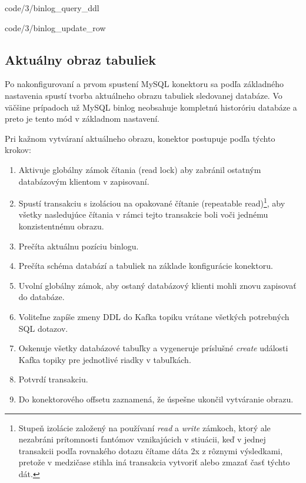 
            {code/3/binlog_query_ddl}


            {code/3/binlog_update_row}
            
\subsection{Aktuálny obraz tabuliek} \label{debezium:conistent_snapshot}
Po nakonfigurovaní a prvom spustení MySQL konektoru sa podľa základného nastavenia spustí tvorba aktuálneho obrazu tabuliek sledovanej databáze. Vo väčšine prípadoch už MySQL binlog neobsahuje kompletnú historóriu databáze a preto je tento mód v základnom nastavení. 

Pri kažnom vytváraní aktuálneho obrazu, konektor postupuje podľa týchto krokov\cite{debezium:consistent_snapshot}:
\begin{enumerate}
\item Aktivuje globálny zámok čítania (read lock) aby zabránil ostatným databázovým klientom v zapisovaní.
\item Spustí transakciu s izoláciou na opakované čítanie (repeatable read)\footnote{Stupeň izolácie založený na používaní \textit{read} a \textit{write} zámkoch, ktorý ale nezabráni prítomnosti fantómov vznikajúcich v stiuácii, keď v jednej transakcii podľa rovnakého dotazu čítame dáta 2x z rôznymi výsledkami, pretože v medzičase stihla iná transakcia vytvoriť alebo zmazať časť týchto dát.}, aby všetky nasledujúce čítania v rámci tejto transakcie boli voči jednému konzistentnému obrazu.
\item Prečíta aktuálnu pozíciu binlogu.
\item Prečíta schéma databází a tabuliek na základe konfigurácie konektoru.
\item Uvolní globálny zámok, aby ostaný databázový klienti mohli znovu zapisovať do databáze.
\item Voliteľne zapíše zmeny DDL do Kafka topiku vrátane všetkých potrebných SQL dotazov.
\item Oskenuje všetky databázové tabuľky a vygeneruje príslušné \textit{create} události  Kafka topiky pre jednotlivé riadky v tabuľkách.
\item Potvrdí transakciu.
\item Do konektorového offsetu zaznamená, že úspešne ukončil vytváranie obrazu.
\end{enumerate}

